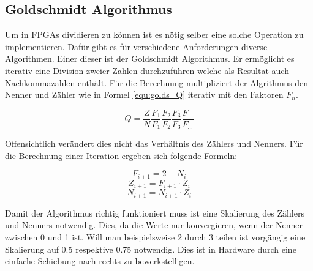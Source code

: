 \subsection{Goldschmidt Algorithmus}\label{subsec:Goldschmidt}

Um in FPGAs dividieren zu können ist es nötig selber eine solche Operation zu implementieren. Dafür gibt es für verschiedene Anforderungen diverse Algorithmen. Einer dieser ist der Goldschmidt Algorithmus. Er ermöglicht es iterativ eine Division zweier Zahlen durchzuführen welche als Resultat auch Nachkommazahlen enthält. Für die Berechnung multipliziert der Algrithmus den Nenner und Zähler wie in Formel \ref{equ:golds_Q} iterativ mit den Faktoren \(F_n\).

\begin{equation}
Q = \frac{Z}{N}\frac{F_1}{F_1}\frac{F_2}{F_2}\frac{F_3}{F_3}\frac{F_{...}}{F_{...}}
\label{equ:golds_Q}
\end{equation}

Offensichtlich verändert dies nicht das Verhältnis des Zählers und Nenners. Für die Berechnung einer Iteration ergeben sich folgende Formeln:

\begin{equation}
F_{i+1} = 2 - N_i
\label{equ:golds_Fi+1}
\end{equation}
\begin{equation}
Z_{i+1} = F_{i+1}\cdot Z_i
\label{equ:golds_Zi+1}
\end{equation}
\begin{equation}
N_{i+1} = N_{i+1}\cdot Z_i
\label{equ:golds_Ni+1}
\end{equation}

Damit der Algorithmus richtig funktioniert muss ist eine Skalierung des Zählers und Nenners notwendig. Dies, da die Werte nur konvergieren, wenn der Nenner zwischen 0 und 1 ist. Will man beispielsweise 2 durch 3 teilen ist vorgängig eine Skalierung auf 0.5 respektive 0.75 notwendig. Dies ist in Hardware durch eine einfache Schiebung nach rechts zu bewerkstelligen.